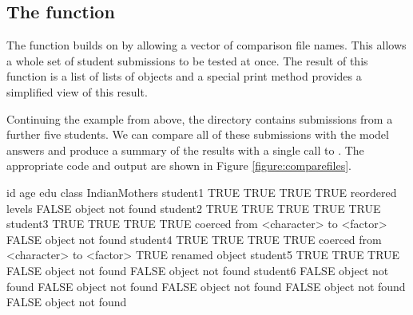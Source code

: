 \subsection*{The  function}

The  function builds on 
by allowing a vector of comparison file names.  This allows a whole
set of student submissions to be tested at once.
The result of this function is a list of lists of 
 objects and a special print method provides
a simplified view of this result.

Continuing the example from above,
the  directory contains submissions from a further
five students.  We can compare all of these submissions
with the model answers and produce a summary of the results with
a single call to . The appropriate code
and output are shown in Figure
\ref{figure:comparefiles}.

\begin{figure*}
\begin{Schunk}
\end{Schunk}
{\scriptsize
\begin{Schunk}
\begin{Soutput}
         id                     age                    edu                    class                                     IndianMothers         
student1 TRUE                   TRUE                   TRUE                   TRUE reordered levels                     FALSE object not found
student2 TRUE                   TRUE                   TRUE                   TRUE                                      TRUE                  
student3 TRUE                   TRUE                   TRUE                   TRUE coerced from <character> to <factor> FALSE object not found
student4 TRUE                   TRUE                   TRUE                   TRUE coerced from <character> to <factor> TRUE renamed object   
student5 TRUE                   TRUE                   TRUE                   FALSE object not found                    FALSE object not found
student6 FALSE object not found FALSE object not found FALSE object not found FALSE object not found                    FALSE object not found
\end{Soutput}
\end{Schunk}
}
\caption{\label{figure:comparefiles}%
Using the  function to run \R{} code from several
files and compare the results to model objects.  The result of this sort
of comparison can easily get quite wide, so it is often useful to 
print the result with  set to some large value
and using a small font, as has been done here.}
\end{figure*}

